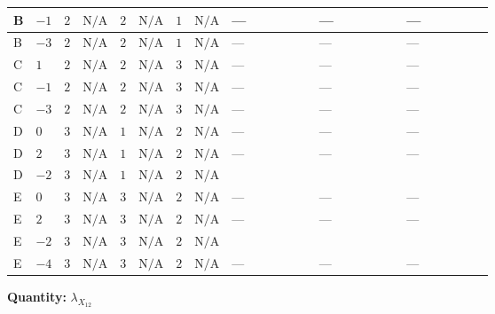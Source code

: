 \documentclass[8pt]{article}
\begin{document}
\begin{landscape}
\begin{longtable}{@{}llcccccc >{\raggedright\arraybackslash}p{0.21\linewidth} >{\raggedright\arraybackslash}p{0.21\linewidth} >{\raggedright\arraybackslash}p{0.21\linewidth}@{}}
\midrule
B & $-1$ & $2$ & $\text{N/A}$ & $2$ & $\text{N/A}$ & $1$ & $\text{N/A}$ & --- & --- & --- \\
\midrule
B & $-3$ & $2$ & $\text{N/A}$ & $2$ & $\text{N/A}$ & $1$ & $\text{N/A}$ & --- & --- & --- \\
\midrule
C & $1$ & $2$ & $\text{N/A}$ & $2$ & $\text{N/A}$ & $3$ & $\text{N/A}$ & --- & --- & --- \\
\midrule
C & $-1$ & $2$ & $\text{N/A}$ & $2$ & $\text{N/A}$ & $3$ & $\text{N/A}$ & --- & --- & --- \\
\midrule
C & $-3$ & $2$ & $\text{N/A}$ & $2$ & $\text{N/A}$ & $3$ & $\text{N/A}$ & --- & --- & --- \\
\midrule
D & $0$ & $3$ & $\text{N/A}$ & $1$ & $\text{N/A}$ & $2$ & $\text{N/A}$ & --- & --- & --- \\
\midrule
D & $2$ & $3$ & $\text{N/A}$ & $1$ & $\text{N/A}$ & $2$ & $\text{N/A}$ & --- & --- & --- \\
\midrule
D & $-2$ & $3$ & $\text{N/A}$ & $1$ & $\text{N/A}$ & $2$ & $\text{N/A}$ & \scriptsize\adjustbox{max width=\linewidth}{$\begin{gathered} -\frac{21 {g_2}^2 {\lambda_{X_{12}}}}{2}\end{gathered}$} & \scriptsize\adjustbox{max width=\linewidth}{$\begin{gathered} -\frac{9 {g_1}^2 {\lambda_{X_{12}}}}{2}\end{gathered}$} & \scriptsize\adjustbox{max width=\linewidth}{$\begin{gathered} +2 {\lambda_{12}^{(1)}} {\lambda_{X_{12}}}\end{gathered}$} \\
\midrule
E & $0$ & $3$ & $\text{N/A}$ & $3$ & $\text{N/A}$ & $2$ & $\text{N/A}$ & --- & --- & --- \\
\midrule
E & $2$ & $3$ & $\text{N/A}$ & $3$ & $\text{N/A}$ & $2$ & $\text{N/A}$ & --- & --- & --- \\
\midrule
E & $-2$ & $3$ & $\text{N/A}$ & $3$ & $\text{N/A}$ & $2$ & $\text{N/A}$ & \scriptsize\adjustbox{max width=\linewidth}{$\begin{gathered} -\frac{33 {g_2}^2 {\lambda_{X_{12}}}}{2}\end{gathered}$} & \scriptsize\adjustbox{max width=\linewidth}{$\begin{gathered} -\frac{9 {g_1}^2 {\lambda_{X_{12}}}}{2}\end{gathered}$} & \scriptsize\adjustbox{max width=\linewidth}{$\begin{gathered} +2 {\lambda_{12}^{(1)}} {\lambda_{X_{12}}}\end{gathered}$} \\
\midrule
E & $-4$ & $3$ & $\text{N/A}$ & $3$ & $\text{N/A}$ & $2$ & $\text{N/A}$ & --- & --- & --- \\
\midrule
\bottomrule
\end{longtable}
\clearpage
\noindent\textbf{Quantity: }${\lambda_{X_{12}}}$\par\smallskip

\end{landscape}
\end{document}
